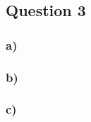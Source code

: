 \subsection*{Question 3}

\subsubsection*{a)}
\noindent 


\subsubsection*{b)}
\noindent 


\subsubsection*{c)}
\noindent 